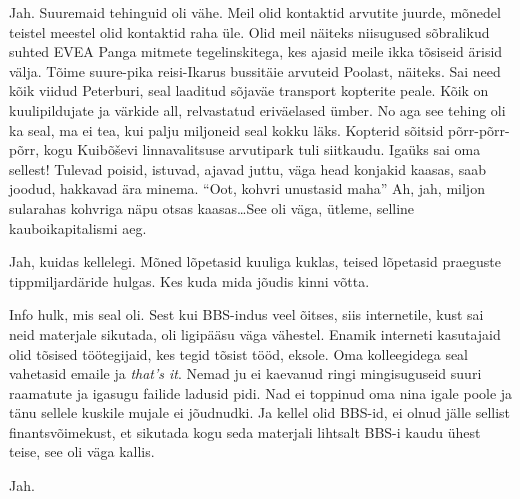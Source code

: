 
Jah. Suuremaid tehinguid oli vähe. Meil olid kontaktid arvutite juurde, mõnedel teistel meestel olid kontaktid raha üle. Olid meil näiteks niisugused sõbralikud suhted EVEA Panga mitmete tegelinskitega, kes ajasid meile ikka tõsiseid ärisid välja. Tõime suure-pika reisi-Ikarus bussitäie arvuteid Poolast, näiteks. Sai need kõik viidud Peterburi, seal laaditud sõjaväe transport kopterite peale. Kõik on kuulipildujate ja värkide all, relvastatud eriväelased ümber. No aga see tehing oli ka seal, ma ei tea, kui palju miljoneid seal kokku läks. Kopterid sõitsid põrr-põrr-põrr, kogu Kuibõševi linnavalitsuse arvutipark tuli siitkaudu. Igaüks sai oma sellest! Tulevad poisid, istuvad, ajavad juttu, väga head konjakid kaasas, saab joodud, hakkavad ära minema. \enquote{Oot, kohvri unustasid maha} Ah, jah, miljon sularahas kohvriga näpu otsas kaasas\ldots See oli väga, ütleme, selline kauboikapitalismi aeg. 


Jah, kuidas kellelegi. Mõned lõpetasid kuuliga kuklas, teised lõpetasid praeguste tippmiljardäride hulgas. Kes kuda mida jõudis kinni võtta.


Info hulk, mis seal oli. Sest kui BBS-indus veel õitses, siis internetile, kust sai neid materjale sikutada, oli ligipääsu väga vähestel. Enamik interneti kasutajaid olid tõsised töötegijaid, kes tegid tõsist tööd, eksole. Oma kolleegidega seal vahetasid emaile ja \emph{that's it}. Nemad ju ei kaevanud ringi mingisuguseid suuri raamatute ja igasugu failide ladusid pidi. Nad ei toppinud oma nina igale poole ja tänu sellele kuskile mujale ei jõudnudki. Ja kellel olid BBS-id, ei olnud jälle sellist finantsvõimekust, et sikutada kogu seda materjali lihtsalt BBS-i kaudu ühest teise, see oli väga kallis.
                 

Jah.


